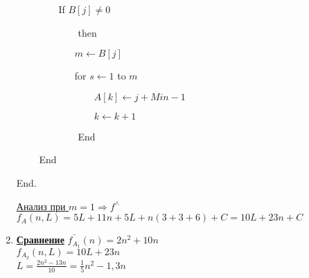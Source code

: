 \documentclass[12pt]{report}
\begin{document}
\begin{enumerate}
		$\qquad\qquad$ If $B[j] \neq 0$\par
		$\qquad\qquad\qquad$ then\par
		$\qquad\qquad\qquad m \leftarrow B[j]$\par
		$\qquad\qquad\qquad$for $s \leftarrow 1$ to $m$\par
		$\qquad\qquad\qquad\qquad A[k] \leftarrow j + Min - 1$\par
		$\qquad\qquad\qquad\qquad k \leftarrow k + 1$\par
		$\qquad\qquad\qquad$ End\par
		$\qquad$ End\par
		End.\par
		
		\underline{Анализ при $m=1 \Rightarrow f^{\wedge}$}\\
		$f_A(n, L) = 5L + 11n + 5L + n(3 + 3 + 6) + C = 10L + 23n + C$\par
		
		\item \textbf{\underline{Сравнение}}
		$\bar{f_{A_1}}(n) = 2n^2 + 10n$\\
		$f_{A_2}(n,L) = 10L + 23n$\\
		$L = \frac{2n^2 - 13n}{10} = \frac{1}{5}n^2 - 1,3n$
	\end{enumerate}
	
\end{document}
